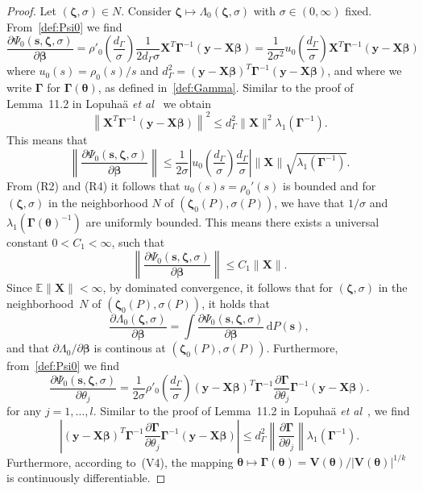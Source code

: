 \documentclass{article}
\numberwithin{equation}{section}
\theoremstyle{plain}
\newcommand{\dd}{\mathrm{d}}
\newcommand{\bbeta}{\bm\beta}
\newcommand{\btheta}{\bm\theta}
\newcommand{\bGamma}{\bm\Gamma}
\newcommand{\bzeta}{\bm\zeta}
\newcommand{\by}{\mathbf{y}}
\newcommand{\bs}{\mathbf{s}}
\newcommand{\bX}{\mathbf{X}}
\newcommand{\bV}{\mathbf{V}}
\newcommand{\E}{\mathbb{E}}
\begin{document}
\begin{proof}
Let $(\bzeta,\sigma)\in N$.
Consider $\bzeta\mapsto\Lambda_0(\bzeta,\sigma)$ with $\sigma\in(0,\infty)$ fixed.
From~\eqref{def:Psi0} we find
\[
\frac{\partial\Psi_0(\bs,\bzeta,\sigma)}{\partial \bbeta}
=
\rho'_0\left(\frac{d_{\Gamma}}{\sigma}\right)
\frac{1}{2d_{\Gamma}\sigma}
\bX^T\bGamma^{-1}(\by-\bX\bbeta)
=
\frac{1}{2\sigma^2}
u_0\left(\frac{d_{\Gamma}}{\sigma}\right)
\bX^T\bGamma^{-1}(\by-\bX\bbeta)
\]
where $u_0(s)=\rho_0(s)/s$ and $d_\Gamma^2=(\by-\bX\bbeta)^T\bGamma^{-1}(\by-\bX\bbeta)$,
and where we write $\bGamma$ for $\bGamma(\btheta)$, as defined in~\eqref{def:Gamma}.
Similar to the proof of Lemma~11.2 in Lopuha\"a \textit{et al}~\cite{lopuhaa-gares-ruizgazen2023} we obtain
\[
\left\|
\bX^T\bGamma^{-1}(\by-\bX\bbeta)
\right\|^2
\leq
d_{\Gamma}^2\|\bX\|^2\lambda_1(\bGamma^{-1}).
\]
This means that
\[
\left\|
\frac{\partial\Psi_0(\bs,\bzeta,\sigma)}{\partial \bbeta}
\right\|
\leq
\frac{1}{2\sigma}
\left|
u_0\left(\frac{d_{\Gamma}}{\sigma}\right)
\frac{d_{\Gamma}}{\sigma}
\right|
\|\bX\|
\sqrt{\lambda_1(\bGamma^{-1})}.
\]
From (R2) and (R4) it follows that $u_0(s)s=\rho_0'(s)$ is bounded
and for $(\bzeta,\sigma)$ in the neighborhood $N$ of $(\bzeta_0(P),\sigma(P))$,
we have that $1/\sigma$ and $\lambda_1(\bGamma(\btheta)^{-1})$ are uniformly bounded.
This means there exists a universal constant $0<C_1<\infty$, such that
\[
\left\|
\frac{\partial\Psi_0(\bs,\bzeta,\sigma)}{\partial \bbeta}
\right\|
\leq C_1\|\bX\|.
\]
Since $\E\|\bX\|<\infty$, by dominated convergence, it follows that
for $(\bzeta,\sigma)$ in the neighborhood~$N$ of $(\bzeta_0(P),\sigma(P))$, it holds that
\[
\frac{\partial\Lambda_0(\bzeta,\sigma)}{\partial \bbeta}
=
\int
\frac{\partial\Psi_0(\bs,\bzeta,\sigma)}{\partial \bbeta}\,\dd P(\bs),
\]
and that $\partial\Lambda_0/\partial\bbeta$ is continous at $(\bzeta_0(P),\sigma(P))$.
Furthermore, from~\eqref{def:Psi0} we find
\[
\frac{\partial\Psi_0(\bs,\bzeta,\sigma)}{\partial \theta_j}
=
\frac{1}{2\sigma}
\rho'_0\left(\frac{d_{\Gamma}}{\sigma}\right)
(\by-\bX\bbeta)^T\bGamma^{-1}\frac{\partial\bGamma}{\partial\theta_j}\bGamma^{-1}(\by-\bX\bbeta).
\]
for any $j=1,\ldots,l$.
Similar to the proof of Lemma~11.2 in Lopuha\"a \textit{et al}~\cite{lopuhaa-gares-ruizgazen2023},
we find
\[
\left|
(\by-\bX\bbeta)^T\bGamma^{-1}
\frac{\partial \bGamma}{\partial \theta_j}
\bGamma^{-1}(\by-\bX\bbeta)
\right|
\leq
d_\Gamma^2
\left\|\frac{\partial \bGamma}{\partial \theta_j}\right\|
\lambda_1(\bGamma^{-1}).
\]
Furthermore, according to~(V4),
the mapping $\btheta\mapsto\bGamma(\btheta)=\bV(\btheta)/|\bV(\btheta)|^{1/k}$ is continuously differentiable.

\end{proof}
\end{document}
